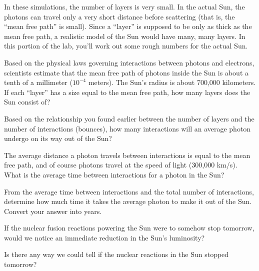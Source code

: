 In these simulations, the number of layers is very small.  In the actual
Sun, the photons can travel only a very short distance before
scattering (that is, the ``mean free path'' is small).  Since a ``layer''
is supposed to be only as thick as the mean
free path, a realistic model of the Sun would have many, many layers.
In this portion of the lab, you'll work out some rough numbers for
the actual Sun.

Based on the physical laws governing interactions between photons
and electrons, scientists estimate that the mean free path
of photons inside the Sun is about a tenth of a millimeter ($10^{-4}$ meters).
The Sun's radius is about 700,000 kilometers.  If
each ``layer'' has a size equal to the mean free path, how many layers
does the Sun consist of?

\vskip 1in

Based on the relationship you found earlier between the number of layers
and the number of interactions (bounces), how many interactions
will an
average photon undergo on its way out of the Sun?

\vskip 1in

The average distance a photon travels between interactions
is equal to the mean free path, and of course photons travel at the
speed of light (300,000 km/s).  What is the average time between
interactions for a photon in the Sun?

\vskip 1in

From the average time between interactions and the total number of
interactions, determine how much time it takes the average photon to
make it out of the Sun.  Convert your answer into years.

\vskip 1.5in

If the nuclear fusion reactions powering the Sun were to somehow stop
tomorrow, would we notice an immediate reduction in the Sun's
luminosity?

\vskip 1in

Is there any way we could tell if the nuclear reactions in the Sun
stopped tomorrow?


